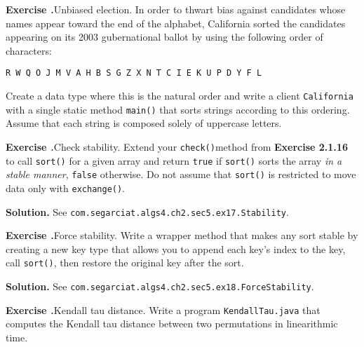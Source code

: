 \documentclass[12pt, a4paper]{article}
\newenvironment{ex}[2][Exercise]
{\par\medskip\noindent \textbf{#1 #2.}}
{\medskip}
\newenvironment{sol}[1][Solution]
{\par\medskip\noindent \textbf{#1.} }
{\medskip}
\begin{document}
	\begin{ex}{16}
		\emph{Unbiased election}. In order to thwart bias against candidates whose
		names appear toward the end of the alphabet, California sorted the candidates
		appearing on its 2003 gubernational ballot by using the following order of
		characters:
		\begin{lstlisting}[language={}]
		R W Q O J M V A H B S G Z X N T C I E K U P D Y F L
		\end{lstlisting}
		Create a data type where this is the natural order and write a client \texttt{California}
		with a single static method \texttt{main()} that sorts strings according to this
		ordering. Assume that each string is composed solely of uppercase letters.
	\end{ex}
	
	\begin{ex}{17}
		\emph{Check stability}. Extend your \texttt{check()}method from \textbf{Exercise 2.1.16}
		to call \texttt{sort()} for a given array and return \texttt{true} if \texttt{sort()}
		sorts the array \emph{in a stable manner}, \texttt{false} otherwise. Do not assume that
		\texttt{sort()} is restricted to move data only with \texttt{exchange()}.
	\end{ex}
	\begin{sol}
		See \texttt{com.segarciat.algs4.ch2.sec5.ex17.Stability}.
	\end{sol}
	\begin{ex}{18}
		\emph{Force stability}. Write a wrapper method that makes any sort stable by creating
		a new key type that allows you to append each key's index to the key, call
		\texttt{sort()}, then restore the original key after the sort.
	\end{ex}
	\begin{sol}
		See \texttt{com.segarciat.algs4.ch2.sec5.ex18.ForceStability}.
	\end{sol}
	\begin{ex}{19}
		\emph{Kendall tau distance}. Write a program \texttt{KendallTau.java} that computes
		the Kendall tau distance between two permutations in linearithmic time.
	\end{ex}
\end{document}

